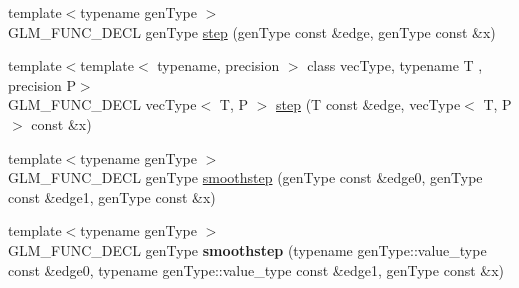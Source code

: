 \begin{DoxyCompactItemize}
\item 
{\footnotesize template$<$typename gen\-Type $>$ }\\G\-L\-M\-\_\-\-F\-U\-N\-C\-\_\-\-D\-E\-C\-L gen\-Type \hyperlink{group__core__func__common_gaf21c84759af7799f573865f70c2f0a86}{step} (gen\-Type const \&edge, gen\-Type const \&x)
\item 
{\footnotesize template$<$template$<$ typename, precision $>$ class vec\-Type, typename T , precision P$>$ }\\G\-L\-M\-\_\-\-F\-U\-N\-C\-\_\-\-D\-E\-C\-L vec\-Type$<$ T, P $>$ \hyperlink{group__core__func__common_gae830a682901c0ba63c92a7d201bba007}{step} (T const \&edge, vec\-Type$<$ T, P $>$ const \&x)
\item 
{\footnotesize template$<$typename gen\-Type $>$ }\\G\-L\-M\-\_\-\-F\-U\-N\-C\-\_\-\-D\-E\-C\-L gen\-Type \hyperlink{group__core__func__common_ga754103c8d2cdaf40f71429252457c10a}{smoothstep} (gen\-Type const \&edge0, gen\-Type const \&edge1, gen\-Type const \&x)
\item 
\hypertarget{group__core__func__common_ga1e7b9e668a0bd2f494a1d49b871a50ea}{{\footnotesize template$<$typename gen\-Type $>$ }\\G\-L\-M\-\_\-\-F\-U\-N\-C\-\_\-\-D\-E\-C\-L gen\-Type {\bfseries smoothstep} (typename gen\-Type\-::value\-\_\-type const \&edge0, typename gen\-Type\-::value\-\_\-type const \&edge1, gen\-Type const \&x)}\label{group__core__func__common_ga1e7b9e668a0bd2f494a1d49b871a50ea}


\end{DoxyCompactItemize}
